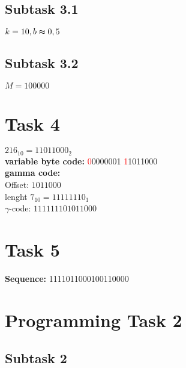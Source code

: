 \documentclass[a4paper]{scrartcl}
\begin{document}
\subsection*{Subtask 3.1}
$k=10, b\thickapprox 0,5$
\subsection*{Subtask 3.2}
$M=100000$

\clearpage
\section*{Task 4}
$216_{10} = 11011000_{2}$ \\ 
\textbf{variable byte code: } \textcolor{red}{0}0000001 \textcolor{red}{1}1011000 \\
\textbf{gamma code: }\\
Offset: $1011000$ \\ lenght $7_{10} = 11111110_{1}$ \\ $\gamma$-code: $111111101011000$

\section*{Task 5}
\textbf{Sequence: }1111011000100110000


\pagebreak
\section*{Programming Task 2}
\subsection*{Subtask 2}

\end{document}
